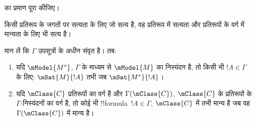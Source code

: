 \documentclass[../../../include/open-logic-section]{subfiles}
\begin{document}
\begin{prob}
   का प्रमाण पूरा कीजिए।
\end{prob}

किसी प्रतिरूप के जगतों पर सत्यता के लिए जो सत्य है, वह प्रतिरूप में सत्यता
और प्रतिरूपों के वर्ग में मान्यता के लिए भी सत्य है।

\begin{cor}
  मान लें कि $\Gamma$ उपसूत्रों के अधीन संवृत है। तब:
  \begin{enumerate}
  \item यदि $\mModel{M^*}$, $\Gamma$ के माध्यम से $\mModel{M}$ का
    निस्यंदन है, तो किसी भी $!A \in \Gamma$ के लिए: $\mSat{M}{!A}$ तभी
    जब $\mSat{M^*}{!A}$।
  \item यदि $\mClass{C}$ प्रतिरूपों का वर्ग है और
    $\Gamma(\mClass{C})$, $\mClass{C}$ के प्रतिरूपों के
    $\Gamma$-निस्यंदनों का वर्ग है, तो कोई भी !!{formula}~$!A \in \Gamma$,
    $\mClass{C}$ में तभी मान्य है जब वह $\Gamma(\mClass{C})$ में मान्य है।
  \end{enumerate}
\end{cor}
\end{document}
